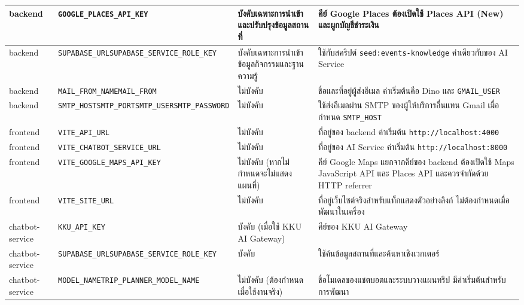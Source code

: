 {\begin{longtable}{|L{1.9cm}|L{4.5cm}|L{2.0cm}|L{4.4cm}|}
\hline
backend & \texttt{GOOGLE\_PLACES\_}\allowbreak\texttt{API\_KEY} & บังคับเฉพาะการนำเข้าและปรับปรุงข้อมูลสถานที่ & คีย์ Google Places ต้องเปิดใช้ Places API (New) และผูกบัญชีชำระเงิน \\
\hline
backend & \texttt{SUPABASE\_URL}\newline\texttt{SUPABASE\_SERVICE\_}\allowbreak\texttt{ROLE\_KEY} & บังคับเฉพาะการนำเข้าข้อมูลกิจกรรมและฐานความรู้ & ใช้กับสคริปต์ \texttt{seed:events-}\allowbreak\texttt{knowledge} ค่าเดียวกับของ AI Service \\
\hline
backend & \texttt{MAIL\_FROM\_NAME}\newline\texttt{MAIL\_FROM} & ไม่บังคับ & ชื่อและที่อยู่ผู้ส่งอีเมล ค่าเริ่มต้นคือ Dino และ \texttt{GMAIL\_USER} \\
\hline
backend & \texttt{SMTP\_HOST}\newline\texttt{SMTP\_PORT}\newline\texttt{SMTP\_USER}\newline\texttt{SMTP\_PASSWORD} & ไม่บังคับ & ใช้ส่งอีเมลผ่าน SMTP ของผู้ให้บริการอื่นแทน Gmail เมื่อกำหนด \texttt{SMTP\_HOST} \\
\hline
frontend & \texttt{VITE\_API\_URL} & ไม่บังคับ & ที่อยู่ของ backend ค่าเริ่มต้น \texttt{http://}\allowbreak\texttt{localhost:4000} \\
\hline
frontend & \texttt{VITE\_CHATBOT\_}\allowbreak\texttt{SERVICE\_URL} & ไม่บังคับ & ที่อยู่ของ AI Service ค่าเริ่มต้น \texttt{http://}\allowbreak\texttt{localhost:8000} \\
\hline
frontend & \texttt{VITE\_GOOGLE\_}\allowbreak\texttt{MAPS\_API\_KEY} & ไม่บังคับ (หากไม่กำหนดจะไม่แสดงแผนที่) & คีย์ Google Maps แยกจากคีย์ของ backend ต้องเปิดใช้ Maps JavaScript API และ Places API และควรจำกัดด้วย HTTP referrer \\
\hline
frontend & \texttt{VITE\_SITE\_URL} & ไม่บังคับ & ที่อยู่เว็บไซต์จริงสำหรับแท็กแสดงตัวอย่างลิงก์ ไม่ต้องกำหนดเมื่อพัฒนาในเครื่อง \\
\hline
chatbot-service & \texttt{KKU\_API\_KEY} & บังคับ (เมื่อใช้ KKU AI Gateway) & คีย์ของ KKU AI Gateway \\
\hline
chatbot-service & \texttt{SUPABASE\_URL}\newline\texttt{SUPABASE\_SERVICE\_}\allowbreak\texttt{ROLE\_KEY} & บังคับ & ใช้ค้นข้อมูลสถานที่และค้นหาเชิงเวกเตอร์ \\
\hline
chatbot-service & \texttt{MODEL\_NAME}\newline\texttt{TRIP\_PLANNER\_}\allowbreak\texttt{MODEL\_NAME} & ไม่บังคับ (ต้องกำหนดเมื่อใช้งานจริง) & ชื่อโมเดลของแชตบอตและระบบวางแผนทริป มีค่าเริ่มต้นสำหรับการพัฒนา \\

\end{longtable}}
